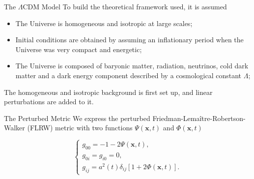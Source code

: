 \documentclass[serif, aspectratio=169]{beamer}
\begin{document}
\begin{frame}{The $\Lambda$CDM Model}
    To build the theoretical framework used, it is assumed

    \begin{itemize}
        \item The Universe is homogeneous and isotropic at large scales; %
        \item Initial conditions are obtained by assuming an inflationary period when the Universe was very compact and energetic;
        \item The Universe is composed of baryonic matter, radiation, neutrinos, cold dark matter and a dark energy component described by a cosmological constant $\Lambda$;
    \end{itemize}

    The homogeneous and isotropic background is first set up, and linear perturbations are added to it.
\end{frame}

\begin{frame}{The Perturbed Metric}
	We express the perturbed Friedman-Lemaître-Robertson-Walker (FLRW) metric with two functions $\Psi(\mathbf{x},t)$ and $\Phi(\mathbf{x},t)$
	
	\begin{equation}
	\begin{cases}
    		g_{00}=-1-2\Psi(\mathbf{x},t),\\
    		g_{0i}=g_{i0}=0,\\
    		g_{ij}=a^2(t)\delta_{ij}[1+2\Phi(\mathbf{x}, t)].
	\end{cases}
	\end{equation}
\end{frame}

%	
%	
%	
\end{document}
